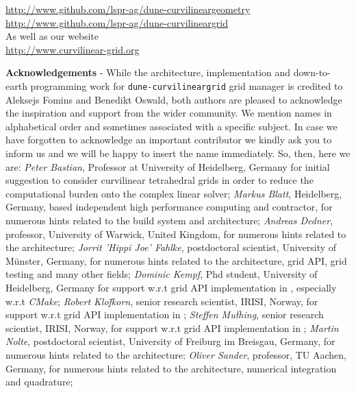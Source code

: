 \documentclass[a4paper,11pt]{book}
\begin{document}
\begin{titlepage}
\noindent
\url{http://www.github.com/lspr-ag/dune-curvilineargeometry}\\
\url{http://www.github.com/lspr-ag/dune-curvilineargrid}\\

\noindent
As well as our website\\

\noindent
\url{http://www.curvilinear-grid.org}





\end{titlepage}






\pagebreak
\vspace{15mm}
\noindent \textbf{Acknowledgements} - While the architecture, implementation and down-to-earth programming work for \texttt{dune-curvilineargrid} grid manager is credited to Aleksejs Fomins and Benedikt Oswald, both authors are pleased to acknowledge the inspiration and support from the wider  community. We mention names in alphabetical order and sometimes associated with a specific subject. In case we have forgotten to acknowledge an important contributor we kindly ask you to inform us and we will be happy to insert the name immediately. So, then, here we are:
\textit{Peter Bastian}, Professor at University of Heidelberg, Germany for initial suggestion to consider curvilinear tetrahedral grids in order to reduce the computational burden onto the complex linear solver;
\textit{Markus Blatt}, Heidelberg, Germany, based independent high performance computing and  contractor, for numerous hints related to the build system and  architecture;
\textit{Andreas Dedner}, professor, University of Warwick, United Kingdom, for numerous hints related to the  architecture;
\textit{Jorrit 'Hippi Joe' Fahlke}, postdoctoral scientist, University of M\"unster, Germany, for numerous hints related to the  architecture, grid API, grid testing and many other fields;
\textit{Dominic Kempf}, Phd student, University of Heidelberg, Germany for support w.r.t grid API implementation in , especially w.r.t \textit{CMake};
\textit{Robert Klo\"fkorn}, senior research scientist, IRISI, Norway, for support w.r.t grid API implementation in ;
\textit{Steffen Mu\"thing}, senior research scientist, IRISI, Norway, for support w.r.t grid API implementation in ;
\textit{Martin Nolte}, postdoctoral scientist, University of Freiburg im Breisgau, Germany, for numerous hints related to the  architecture;
\textit{Oliver Sander}, professor, TU Aachen, Germany, for numerous hints related to the  architecture, numerical integration and quadrature;
\end{document}
